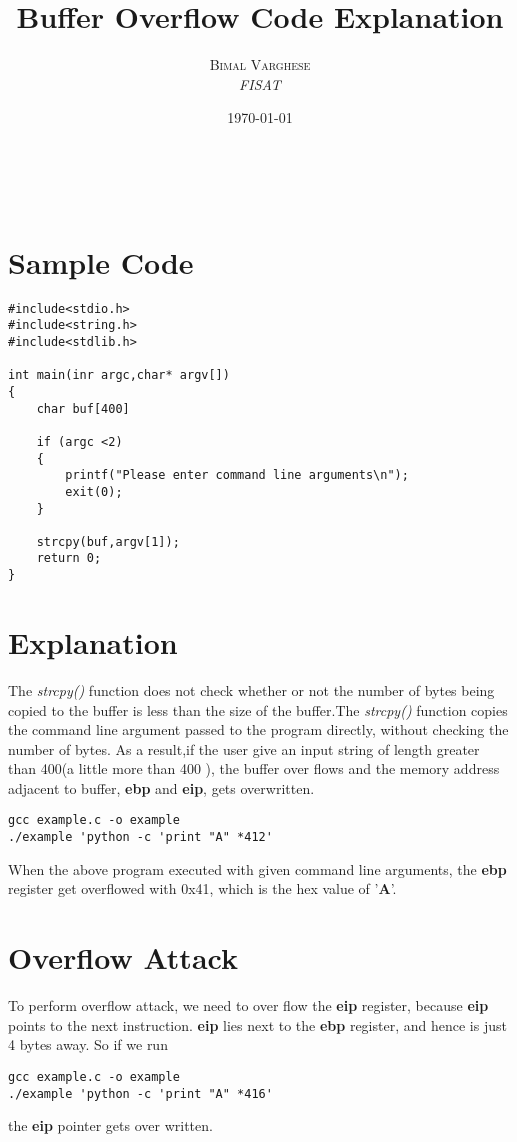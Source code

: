 \documentclass[a4paper, 11pt]{article} %
\title{\textbf{Buffer Overflow} Code Explanation %
} %
\author{\textsc{Bimal Varghese} %
\\{\textit{FISAT}}} %
\date{\today} %
\makeatletter
\renewcommand{\maketitle}{ %
\begin{center} %
{\LARGE\@title} %

\vspace{10pt} %

{\large\@author} %
\\\@date %

\vspace{10pt} %
\end{center}
}
\makeatother
\begin{document}
\maketitle %




\section*{Sample Code}

\begin{lstlisting}
#include<stdio.h>
#include<string.h>
#include<stdlib.h>

int main(inr argc,char* argv[])
{
	char buf[400]
	
	if (argc <2)
	{
		printf("Please enter command line arguments\n");
		exit(0);
	}
	
	strcpy(buf,argv[1]);
	return 0;
}

\end{lstlisting}


\section*{Explanation}
The \textit{strcpy()} function does not check whether or not the number of bytes being copied to the buffer is less than the size of the buffer.The \textit{strcpy()} function copies  the command line argument passed to the program directly, without checking the number of bytes. As a result,if the user give an input string of length greater than 400(a little more than 400 ), the buffer over flows and the memory address adjacent to buffer, \textbf{ebp} and \textbf{eip}, gets overwritten.

\begin{verbatim}
gcc example.c -o example
./example 'python -c 'print "A" *412'
\end{verbatim}

	When the above program executed with given command line arguments, the \textbf{ebp} register get overflowed with 0x41, which is the hex value of '\textbf{A}'.

\section*{Overflow Attack}	
	To perform overflow attack, we need to over flow the \textbf{eip} register, because \textbf{eip} points to the next instruction. \textbf{eip} lies next to the \textbf{ebp} register, and hence is just 4 bytes away. So if we run 
\begin{verbatim}
gcc example.c -o example
./example 'python -c 'print "A" *416'
\end{verbatim}
	the \textbf{eip} pointer gets over written.
	
\end{document}
